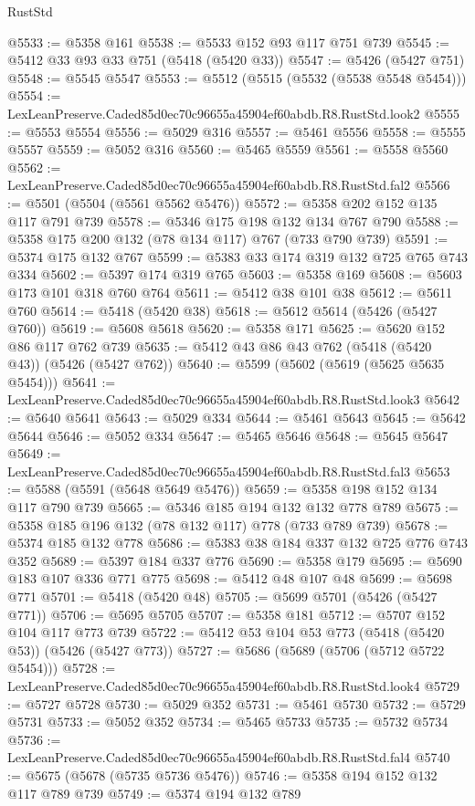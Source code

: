 \begin{lexlean}{RustStd}
\begin{coremodule}
@5533 := @5358 @161
@5538 := @5533 @152 @93 @117 @751 @739
@5545 := @5412 @33 @93 @33 @751 (@5418 (@5420 @33))
@5547 := @5426 (@5427 @751)
@5548 := @5545 @5547
@5553 := @5512 (@5515 (@5532 (@5538 @5548 @5454)))
@5554 := LexLeanPreserve.Caded85d0ec70c96655a45904ef60abdb.R8.RustStd.look2
@5555 := @5553 @5554
@5556 := @5029 @316
@5557 := @5461 @5556
@5558 := @5555 @5557
@5559 := @5052 @316
@5560 := @5465 @5559
@5561 := @5558 @5560
@5562 := LexLeanPreserve.Caded85d0ec70c96655a45904ef60abdb.R8.RustStd.fal2
@5566 := @5501 (@5504 (@5561 @5562 @5476))
@5572 := @5358 @202 @152 @135 @117 @791 @739
@5578 := @5346 @175 @198 @132 @134 @767 @790
@5588 := @5358 @175 @200 @132 (@78 @134 @117) @767 (@733 @790 @739)
@5591 := @5374 @175 @132 @767
@5599 := @5383 @33 @174 @319 @132 @725 @765 @743 @334
@5602 := @5397 @174 @319 @765
@5603 := @5358 @169
@5608 := @5603 @173 @101 @318 @760 @764
@5611 := @5412 @38 @101 @38
@5612 := @5611 @760
@5614 := @5418 (@5420 @38)
@5618 := @5612 @5614 (@5426 (@5427 @760))
@5619 := @5608 @5618
@5620 := @5358 @171
@5625 := @5620 @152 @86 @117 @762 @739
@5635 := @5412 @43 @86 @43 @762 (@5418 (@5420 @43)) (@5426 (@5427 @762))
@5640 := @5599 (@5602 (@5619 (@5625 @5635 @5454)))
@5641 := LexLeanPreserve.Caded85d0ec70c96655a45904ef60abdb.R8.RustStd.look3
@5642 := @5640 @5641
@5643 := @5029 @334
@5644 := @5461 @5643
@5645 := @5642 @5644
@5646 := @5052 @334
@5647 := @5465 @5646
@5648 := @5645 @5647
@5649 := LexLeanPreserve.Caded85d0ec70c96655a45904ef60abdb.R8.RustStd.fal3
@5653 := @5588 (@5591 (@5648 @5649 @5476))
@5659 := @5358 @198 @152 @134 @117 @790 @739
@5665 := @5346 @185 @194 @132 @132 @778 @789
@5675 := @5358 @185 @196 @132 (@78 @132 @117) @778 (@733 @789 @739)
@5678 := @5374 @185 @132 @778
@5686 := @5383 @38 @184 @337 @132 @725 @776 @743 @352
@5689 := @5397 @184 @337 @776
@5690 := @5358 @179
@5695 := @5690 @183 @107 @336 @771 @775
@5698 := @5412 @48 @107 @48
@5699 := @5698 @771
@5701 := @5418 (@5420 @48)
@5705 := @5699 @5701 (@5426 (@5427 @771))
@5706 := @5695 @5705
@5707 := @5358 @181
@5712 := @5707 @152 @104 @117 @773 @739
@5722 := @5412 @53 @104 @53 @773 (@5418 (@5420 @53)) (@5426 (@5427 @773))
@5727 := @5686 (@5689 (@5706 (@5712 @5722 @5454)))
@5728 := LexLeanPreserve.Caded85d0ec70c96655a45904ef60abdb.R8.RustStd.look4
@5729 := @5727 @5728
@5730 := @5029 @352
@5731 := @5461 @5730
@5732 := @5729 @5731
@5733 := @5052 @352
@5734 := @5465 @5733
@5735 := @5732 @5734
@5736 := LexLeanPreserve.Caded85d0ec70c96655a45904ef60abdb.R8.RustStd.fal4
@5740 := @5675 (@5678 (@5735 @5736 @5476))
@5746 := @5358 @194 @152 @132 @117 @789 @739
@5749 := @5374 @194 @132 @789

\end{coremodule}
\end{lexlean}
